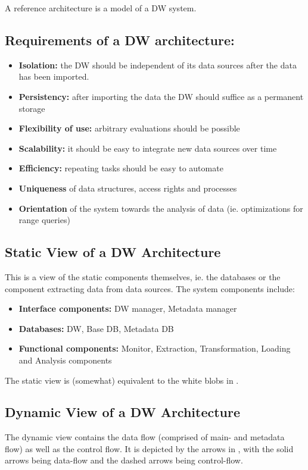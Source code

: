 \documentclass{article}
\begin{document}
\begin{keypointbox}
    A reference architecture is a model of a DW system.
\end{keypointbox}

\subsection{Requirements of a DW architecture:}
\begin{itemize}
    \item \textbf{Isolation:} the DW should be independent of its data sources after the data has been imported.
    \item \textbf{Persistency:} after importing the data the DW should suffice as a permanent storage
    \item \textbf{Flexibility of use:} arbitrary evaluations should be possible
    \item \textbf{Scalability:} it should be easy to integrate new data sources over time
    \item \textbf{Efficiency:} repeating tasks should be easy to automate
    \item \textbf{Uniqueness} of data structures, access rights and processes
    \item \textbf{Orientation} of the system towards the analysis of data (ie. optimizations for range queries)
\end{itemize}

\subsection{Static View of a DW Architecture}
This is a view of the static components themselves, ie. the databases or the component extracting data from data sources.
The system components include:
\begin{itemize}
    \item \textbf{Interface components:} DW manager, Metadata manager
    \item \textbf{Databases:} DW, Base DB, Metadata DB
    \item \textbf{Functional components:} Monitor, Extraction, Transformation, Loading and Analysis components
\end{itemize}

The static view is (somewhat) equivalent to the white blobs in .

\subsection{Dynamic View of a DW Architecture}
The dynamic view contains the data flow (comprised of main- and metadata flow) as well as the control flow.
It is depicted by the arrows in , with the solid arrows being data-flow and the dashed arrows being control-flow.
\end{document}
